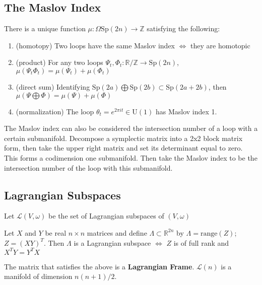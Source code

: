 \subsection{The Maslov Index}

\begin{thm}

There is a unique function $\mu: \Omega \mathrm{Sp}(2n) \to \mathbb{Z}$ satisfying the following: 
\begin{enumerate}
    \item (homotopy) Two loops have the same Maslov index $\iff$ they are homotopic
    \item (product) For any two loops $\Psi_t, \Phi_t: \mathbb{R/Z} \to \mathrm{Sp}(2n)$, $\mu(\Psi_t \Phi_t) = \mu(\Psi_t) + \mu(\Phi_t)$
    \item (direct sum) Identifying $ \mathrm{Sp}(2a) \bigoplus \mathrm{Sp}(2b) \subset \mathrm{Sp}(2a+2b)$, then $\mu(\Psi \bigoplus \Phi) = \mu(\Psi) + \mu (\Phi) $
    \item (normalization) The loop $\theta_t = e^{2 \pi i t} \in \mathrm{U}(1)$ has Maslov index 1.
\end{enumerate}

\end{thm}

The Maslov index can also be considered the intersection number of a loop with a certain submanifold. Decompose a symplectic matrix into a 2x2 block matrix form, then take the upper right matrix and set its determinant equal to zero. This forms a codimension one submanifold. Then take the Maslov index to be the intersection number of the loop with this submanifold.

\subsection{Lagrangian Subspaces}

Let $\mathcal{L}(V,\omega)$ be the set of Lagrangian subspaces of $(V,\omega)$

\begin{lem}

Let $X$ and $Y$ be real $n \times n$ matrices and define $\Lambda \subset \mathbb{R}^{2n} $ by $\Lambda = \mathrm{range}(Z)$; $Z = (X Y)^{T}$. Then $\Lambda$ is a Lagrangian subspace $\iff$ $Z$ is of full rank and $X^T Y = Y^T X$

\end{lem}

The matrix that satisfies the above is a \textbf{Lagrangian Frame}. $\mathcal{L}(n)$ is a manifold of dimension $n(n+1)/2$.

